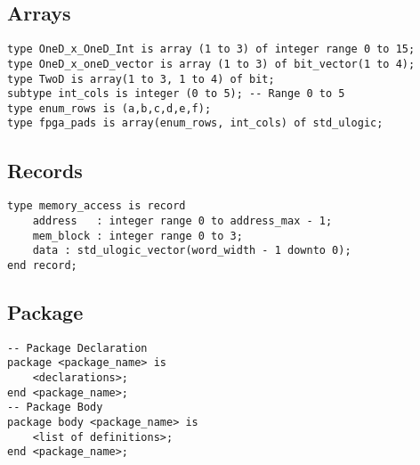 \subsection{Arrays}
\begin{lstlisting}
type OneD_x_OneD_Int is array (1 to 3) of integer range 0 to 15;
type OneD_x_oneD_vector is array (1 to 3) of bit_vector(1 to 4);
type TwoD is array(1 to 3, 1 to 4) of bit;
subtype int_cols is integer (0 to 5); -- Range 0 to 5
type enum_rows is (a,b,c,d,e,f);
type fpga_pads is array(enum_rows, int_cols) of std_ulogic;
\end{lstlisting}
\vspace{-30pt}

\subsection{Records}
\begin{lstlisting}
type memory_access is record
	address   : integer range 0 to address_max - 1;
	mem_block : integer range 0 to 3;
	data : std_ulogic_vector(word_width - 1 downto 0);
end record;
\end{lstlisting}
\vspace{-30pt}


\subsection{Package}
\begin{lstlisting}
-- Package Declaration
package <package_name> is
	<declarations>;
end <package_name>;
-- Package Body
package body <package_name> is
	<list of definitions>;
end <package_name>;
\end{lstlisting}

